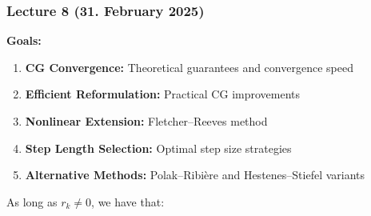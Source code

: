 \subsubsection{Lecture 8 (31. February 2025)}

\textbf{Goals:}
\begin{enumerate}
    \item \textbf{CG Convergence:} Theoretical guarantees and convergence speed
    \item \textbf{Efficient Reformulation:} Practical CG improvements
    \item \textbf{Nonlinear Extension:} Fletcher--Reeves method
    \item \textbf{Step Length Selection:} Optimal step size strategies
    \item \textbf{Alternative Methods:} Polak--Ribière and Hestenes--Stiefel variants
\end{enumerate}

\begin{theorem}{}{}
    As long as \(r_k \neq 0\), we have that:
    \begin{itemize}
        \item \(\inner{
    \end{itemize}
\end{theorem}